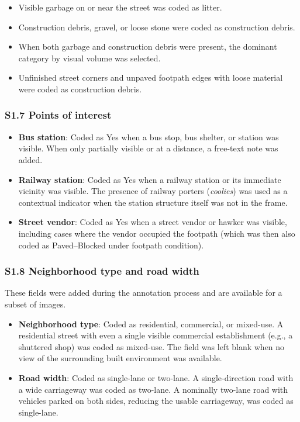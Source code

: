\documentclass[12pt]{article}
\begin{document}
\begin{itemize}[nosep]
\item Visible garbage on or near the street was coded as litter.
\item Construction debris, gravel, or loose stone were coded as construction debris.
\item When both garbage and construction debris were present, the dominant category by visual volume was selected.
\item Unfinished street corners and unpaved footpath edges with loose material were coded as construction debris.
\end{itemize}

\subsubsection*{S1.7 Points of interest}

\begin{itemize}[nosep]
\item \textbf{Bus station}: Coded as Yes when a bus stop, bus shelter, or station was visible. When only partially visible or at a distance, a free-text note was added.
\item \textbf{Railway station}: Coded as Yes when a railway station or its immediate vicinity was visible. The presence of railway porters (\textit{coolies}) was used as a contextual indicator when the station structure itself was not in the frame.
\item \textbf{Street vendor}: Coded as Yes when a street vendor or hawker was visible, including cases where the vendor occupied the footpath (which was then also coded as Paved--Blocked under footpath condition).
\end{itemize}

\subsubsection*{S1.8 Neighborhood type and road width}

These fields were added during the annotation process and are available for a subset of images.

\begin{itemize}[nosep]
\item \textbf{Neighborhood type}: Coded as residential, commercial, or mixed-use. A residential street with even a single visible commercial establishment (e.g., a shuttered shop) was coded as mixed-use. The field was left blank when no view of the surrounding built environment was available.
\item \textbf{Road width}: Coded as single-lane or two-lane. A single-direction road with a wide carriageway was coded as two-lane. A nominally two-lane road with vehicles parked on both sides, reducing the usable carriageway, was coded as single-lane.
\end{itemize}
\end{document}
